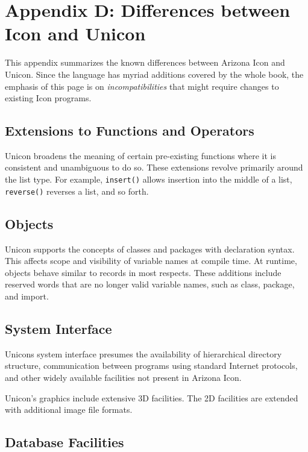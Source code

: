 \clearpage\section{Appendix D: Differences between Icon and Unicon}

This appendix summarizes the known differences between Arizona Icon and
Unicon. Since the language has myriad additions covered by the whole book,
the emphasis of this page is on {\em incompatibilities\/} that might
require changes to existing Icon programs.

\subsection{Extensions to Functions and Operators}

Unicon broadens the meaning of certain pre-existing functions where it
is consistent and unambiguous to do so. These extensions revolve
primarily around the list type. For example,
\texttt{insert()} allows insertion into the middle of a
list, \texttt{reverse()} reverses a list, and so forth.

\subsection{Objects}

Unicon supports the concepts of classes and packages with declaration
syntax. This affects scope and visibility of variable names at compile
time. At runtime, objects behave similar to records in most respects.
These additions include reserved words that are no longer valid variable
names, such as class, package, and import.

\subsection{System Interface}

Unicon{\textquotesingle}s system interface presumes the availability of
hierarchical directory structure, communication between programs using
standard Internet protocols, and other widely available facilities not
present in Arizona Icon.

Unicon's graphics include extensive 3D facilities.  The 2D facilities
are extended with additional image file formats.

\subsection{Database Facilities}

